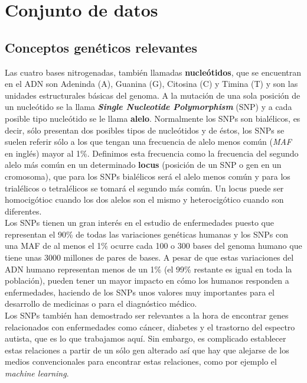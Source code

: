 
\chapter{Conjunto de datos}\label{ch:base-datos}

\section{Conceptos genéticos relevantes}\label{st:conceptos-geneticos}
Las cuatro bases nitrogenadas, también llamadas \textbf{nucleótidos}, que se encuentran en el ADN son Adeninda (A), Guanina (G), Citosina (C) y Timina (T) y son las unidades estructurales básicas del genoma. A la mutación de una sola posición de un nucleótido se la llama \textbf{\textit{Single Nucleotide Polymorphism}} (SNP) y a cada posible tipo nucleótido se le llama \textbf{alelo}. Normalmente los SNPs son bialélicos, es decir, sólo presentan dos posibles tipos de nucleótidos y de éstos, los SNPs se suelen referir sólo a los que tengan una frecuencia de alelo menos común (\textit{MAF} en inglés) mayor al 1\%. Definimos esta frecuencia como la frecuencia del segundo alelo más común en un determinado \textbf{locus} (posición de un SNP o gen en un cromosoma), que para los SNPs bialélicos será el alelo menos común y para los trialélicos o tetralélicos se tomará el segundo más común. Un locus puede ser homocigótioc cuando los dos alelos son el mismo y heterocigótico cuando son diferentes. \cite{su2007single}\\
Los SNPs tienen un gran interés en el estudio de enfermedades puesto que representan el 90\% de todas las variaciones genéticas humanas y los SNPs con una MAF de al menos el 1\% ocurre cada 100 o 300 bases del genoma humano que tiene unas 3000 millones de pares de bases. A pesar de que estas variaciones del ADN humano representan menos de un 1\% (el 99\% restante es igual en toda la población), pueden tener un mayor impacto en cómo los humanos responden a enfermedades, haciendo de los SNPs unos valores muy importantes para el desarrollo de medicinas o para el diagnóstico médico. \cite{su2007single}\\
Los SNPs también han demostrado ser relevantes a la hora de encontrar genes relacionados con enfermedades como cáncer, diabetes y el trastorno del espectro autista, que es lo que trabajamos aquí. Sin embargo, es complicado establecer estas relaciones a partir de un sólo gen alterado así que hay que alejarse de los medios convencionales para encontrar estas relaciones, como por ejemplo el \textit{machine learning}. \cite{su2007single}\\\\
